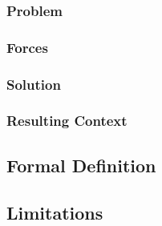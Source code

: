 \subsubsection{Problem}
\subsubsection{Forces}
\subsubsection{Solution}
\subsubsection{Resulting Context}

\subsection{Formal Definition}

\subsection{Limitations}
